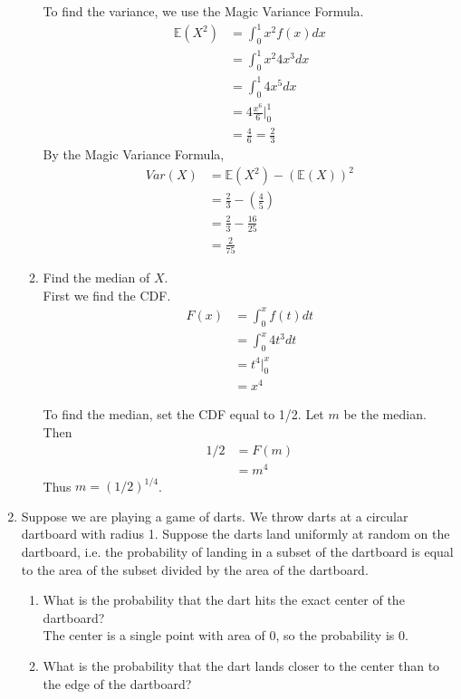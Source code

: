 \documentclass[12pt]{article}
\def\E{{\mathbb E}}
\begin{document}
\begin{enumerate}
\begin{enumerate}
To find the variance, we use the Magic Variance Formula.
\begin{align*}
\E(X^2) &= \int_0^1 x^2 f(x) dx \\
&= \int_0^1 x^2 4x^3 dx \\
&= \int_0^1 4x^5 dx \\
&= 4 \frac{x^6}{6}\Bigr|_0^1 \\
&= \frac{4}{6} = \frac{2}{3}
\end{align*}
By the Magic Variance Formula,
\begin{align*}
Var(X) &= \E(X^2) - (\E(X))^2 \\
&= \frac{2}{3} - \left( \frac{4}{5} \right) \\
&= \frac{2}{3} - \frac{16}{25} \\
&= \frac{2}{75}
\end{align*}

\item Find the median of $X$.\\
First we find the CDF.
\begin{align*}
F(x) &= \int_0^x f(t) dt \\
&= \int_0^x 4t^3 dt \\
&= t^4 \Bigr|_0^x \\
&= x^4
\end{align*}

To find the median, set the CDF equal to 1/2. Let $m$ be the median. Then
\begin{align*}
1/2 &= F(m) \\
&= m^4
\end{align*}
Thus $m = (1/2)^{1/4}$.

\end{enumerate}

\item Suppose we are playing a game of darts. We throw darts at a circular dartboard with radius 1. Suppose the darts land uniformly at random on the dartboard, i.e. the probability of landing in a subset of the dartboard is equal to the area of the subset divided by the area of the dartboard.
\begin{enumerate}
\item What is the probability that the dart hits the exact center of the dartboard?\\

The center is a single point with area of 0, so the probability is 0.

\item What is the probability that the dart lands closer to the center than to the edge of the dartboard?\\


\end{enumerate}
\end{enumerate}
\end{document}
